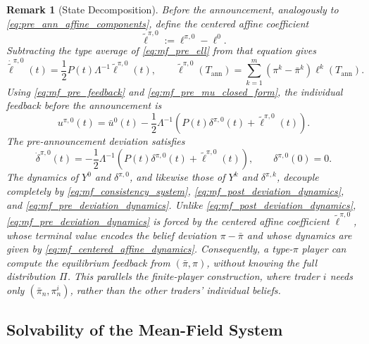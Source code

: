 \documentclass[12pt]{article}
\numberwithin{equation}{section}
\newtheorem{remark}[theorem]{Remark}
\theoremstyle{definition}
\begin{document}
\begin{remark}[State Decomposition]
Before the announcement, analogously to
\eqref{eq:pre_ann_affine_components}, define the centered affine coefficient
\[
\widetilde\ell^{\pi,0}:=\ell^{\pi,0}-\ell^0.
\]
Subtracting the type average of \eqref{eq:mf_pre_ell} from that equation gives
\begin{equation}\label{eq:mf_centered_affine_dynamics}
\dot{\widetilde\ell}^{\pi,0}(t)
=
\frac12P(t)\Lambda^{-1}\widetilde\ell^{\pi,0}(t),
\qquad
\widetilde\ell^{\pi,0}(T_{\mathrm{ann}})
=
\sum_{k=1}^m
(\pi^k-\bar\pi^k)\ell^k(T_{\mathrm{ann}}).
\end{equation}
Using \eqref{eq:mf_pre_feedback} and
\eqref{eq:mf_pre_mu_closed_form}, the individual feedback before the
announcement is
\begin{equation}\label{eq:mf_pre_feedback_decomposition}
u^{\pi,0}(t)
=
\bar u^0(t)-\frac12\Lambda^{-1}
\left(
P(t)\delta^{\pi,0}(t)+\widetilde\ell^{\pi,0}(t)
\right).
\end{equation}
The pre-announcement deviation satisfies
\begin{equation}\label{eq:mf_pre_deviation_dynamics}
\dot\delta^{\pi,0}(t)
=
-\frac12\Lambda^{-1}
\left(
P(t)\delta^{\pi,0}(t)+\widetilde\ell^{\pi,0}(t)
\right),
\qquad
\delta^{\pi,0}(0)=0.
\end{equation}
The dynamics of \(Y^0\) and \(\delta^{\pi,0}\), and likewise those of \(Y^k\)
and \(\delta^{\pi,k}\), decouple completely by
\eqref{eq:mf_consistency_system}, \eqref{eq:mf_post_deviation_dynamics}, and
\eqref{eq:mf_pre_deviation_dynamics}. Unlike
\eqref{eq:mf_post_deviation_dynamics},
\eqref{eq:mf_pre_deviation_dynamics} is forced by the centered affine
coefficient \(\widetilde\ell^{\pi,0}\), whose terminal value encodes the
belief deviation \(\pi-\bar\pi\) and whose dynamics are given by
\eqref{eq:mf_centered_affine_dynamics}. Consequently, a type-\(\pi\) player
can compute the equilibrium feedback from \((\bar\pi,\pi)\), without knowing
the full distribution \(\Pi\). This parallels the finite-player construction,
where trader \(i\) needs only \((\bar\pi_n,\pi_n^i)\), rather than the other
traders' individual beliefs.
\end{remark}

\subsection{Solvability of the Mean-Field System}
\end{document}
